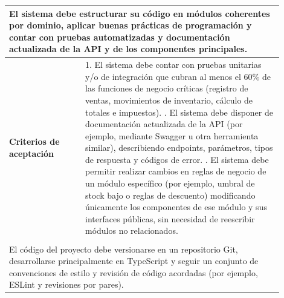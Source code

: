 \begin{longtable}{|p{0.25\linewidth}|p{0.15\linewidth}|p{0.15\linewidth}|p{0.35\linewidth}|}
		\multicolumn{4}{|p{0.96\linewidth}|}{%
		El sistema debe estructurar su código en módulos coherentes por dominio, aplicar buenas prácticas de programación y contar con pruebas automatizadas y documentación actualizada de la API y de los componentes principales.}                                                             \\ \hline
		\cellcolor{tableheaderblue}\textbf{Criterios de aceptación} & \multicolumn{3}{p{0.70\linewidth}|}{                                                                                                                                                                                        %
			1. El sistema debe contar con pruebas unitarias y/o de integración que cubran al menos el 60\% de las funciones de negocio críticas (registro de ventas, movimientos de inventario, cálculo de totales e impuestos). \newline
			2. El sistema debe disponer de documentación actualizada de la API (por ejemplo, mediante Swagger u otra herramienta similar), describiendo endpoints, parámetros, tipos de respuesta y códigos de error. \newline
		3. El sistema debe permitir realizar cambios en reglas de negocio de un módulo específico (por ejemplo, umbral de stock bajo o reglas de descuento) modificando únicamente los componentes de ese módulo y sus interfaces públicas, sin necesidad de reescribir módulos no relacionados.} \\ \hline
		\rowcolor{tableheaderblue}
		\multicolumn{4}{|l|}{\textbf{Restricciones}}                                                                                                                                                                                                                                              \\ \hline
		\multicolumn{4}{|p{0.96\linewidth}|}{%
		El código del proyecto debe versionarse en un repositorio Git, desarrollarse principalmente en TypeScript y seguir un conjunto de convenciones de estilo y revisión de código acordadas (por ejemplo, ESLint y revisiones por pares).}                                                    \\ \hline
	
\end{longtable}
\endgroup


